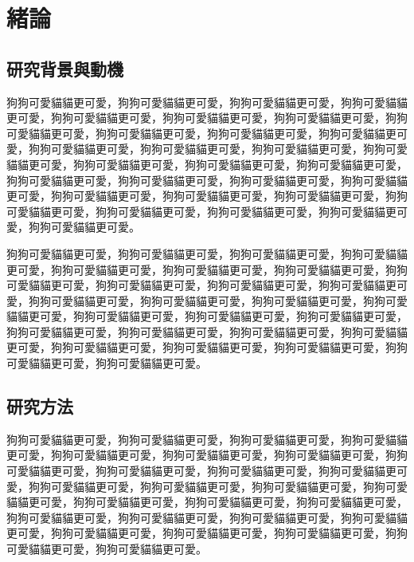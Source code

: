 \chapter{緒論}  %
\label{c:intro}


\section{研究背景與動機}

狗狗可愛貓貓更可愛，狗狗可愛貓貓更可愛，狗狗可愛貓貓更可愛，狗狗可愛貓貓更可愛，狗狗可愛貓貓更可愛，狗狗可愛貓貓更可愛，狗狗可愛貓貓更可愛，狗狗可愛貓貓更可愛，狗狗可愛貓貓更可愛，狗狗可愛貓貓更可愛，狗狗可愛貓貓更可愛，狗狗可愛貓貓更可愛，狗狗可愛貓貓更可愛，狗狗可愛貓貓更可愛，狗狗可愛貓貓更可愛，狗狗可愛貓貓更可愛，狗狗可愛貓貓更可愛，狗狗可愛貓貓更可愛，狗狗可愛貓貓更可愛，狗狗可愛貓貓更可愛，狗狗可愛貓貓更可愛，狗狗可愛貓貓更可愛，狗狗可愛貓貓更可愛，狗狗可愛貓貓更可愛，狗狗可愛貓貓更可愛，狗狗可愛貓貓更可愛，狗狗可愛貓貓更可愛，狗狗可愛貓貓更可愛，狗狗可愛貓貓更可愛，狗狗可愛貓貓更可愛。\par

狗狗可愛貓貓更可愛，狗狗可愛貓貓更可愛，狗狗可愛貓貓更可愛，狗狗可愛貓貓更可愛，狗狗可愛貓貓更可愛，狗狗可愛貓貓更可愛，狗狗可愛貓貓更可愛，狗狗可愛貓貓更可愛，狗狗可愛貓貓更可愛，狗狗可愛貓貓更可愛，狗狗可愛貓貓更可愛，狗狗可愛貓貓更可愛，狗狗可愛貓貓更可愛，狗狗可愛貓貓更可愛，狗狗可愛貓貓更可愛，狗狗可愛貓貓更可愛，狗狗可愛貓貓更可愛，狗狗可愛貓貓更可愛，狗狗可愛貓貓更可愛，狗狗可愛貓貓更可愛，狗狗可愛貓貓更可愛，狗狗可愛貓貓更可愛，狗狗可愛貓貓更可愛，狗狗可愛貓貓更可愛，狗狗可愛貓貓更可愛，狗狗可愛貓貓更可愛，狗狗可愛貓貓更可愛。

\section{研究方法}

狗狗可愛貓貓更可愛，狗狗可愛貓貓更可愛，狗狗可愛貓貓更可愛，狗狗可愛貓貓更可愛，狗狗可愛貓貓更可愛，狗狗可愛貓貓更可愛，狗狗可愛貓貓更可愛，狗狗可愛貓貓更可愛，狗狗可愛貓貓更可愛，狗狗可愛貓貓更可愛，狗狗可愛貓貓更可愛，狗狗可愛貓貓更可愛，狗狗可愛貓貓更可愛，狗狗可愛貓貓更可愛，狗狗可愛貓貓更可愛，狗狗可愛貓貓更可愛，狗狗可愛貓貓更可愛，狗狗可愛貓貓更可愛，狗狗可愛貓貓更可愛，狗狗可愛貓貓更可愛，狗狗可愛貓貓更可愛，狗狗可愛貓貓更可愛，狗狗可愛貓貓更可愛，狗狗可愛貓貓更可愛，狗狗可愛貓貓更可愛，狗狗可愛貓貓更可愛，狗狗可愛貓貓更可愛。